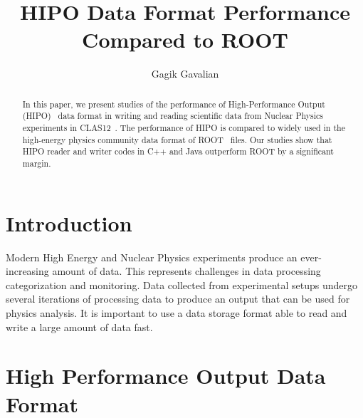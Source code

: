 \documentclass[preprint,12pt]{elsarticle}
\title{HIPO Data Format Performance Compared to ROOT}
\author[1]{Gagik Gavalian}
\begin{document}
\begin{abstract}
  In this paper, we present studies of the performance of High-Performance Output (HIPO)~\cite{HipoLib} data format in
  writing and reading scientific data from Nuclear Physics experiments in CLAS12~\cite{Burkert:2020akg}. The performance of
  HIPO is compared to widely used in the high-energy physics community data format of ROOT~\cite{Brun:1997pa} files.
  Our studies show that HIPO reader and writer codes in C++ and Java outperform ROOT by a significant margin.
\end{abstract}
\maketitle

\section{Introduction}
\indent

Modern High Energy and Nuclear Physics experiments produce an ever-increasing amount of data. This represents 
challenges in data processing categorization and monitoring. Data collected from experimental setups undergo several
iterations of processing data to produce an output that can be used for physics analysis. It is important to use a data storage 
format able to read and write a large amount of data fast. 

\section{High Performance Output Data Format}
\end{document}
